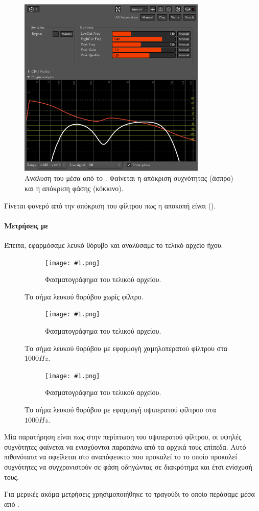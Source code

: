 \documentclass[12pt]{extarticle}
\newcommand{\filterspectrums}[2]
{
\begin{figure}
     \centering
     \begin{subfigure}[b]{\textwidth}
         \centering
         \texttt{[image: \#1.png]}
         \caption{Φασματογράφημα του τελικού αρχείου.}
     \end{subfigure}
     \hfill
     \hfill
        \caption{#2}
\end{figure}
}
\begin{document}
\begin{figure}[htpb]
    \centering
    \includegraphics[width=0.8\textwidth]{./assets/PluginAnalysisArdour.png}
    \caption{Ανάλυση του  μέσα από το . Φαίνεται η απόκριση συχνότητας (άσπρο) και η απόκριση φάσης (κόκκινο).}
    \label{fig:ardour_analysis}
\end{figure}

Γίνεται φανερό από την απόκριση του φίλτρου πως η αποκοπή 
είναι  (). 

\paragraph{Μετρήσεις με }
Έπειτα, εφαρμόσαμε λευκό θόρυβο και αναλύσαμε το τελικό αρχείο ήχου.

\filterspectrums{./assets/WhiteNoise}{Το σήμα λευκού θορύβου χωρίς φίλτρο.}
\filterspectrums{./assets/WhiteNoiseLP}{Το σήμα λευκού θορύβου με εφαρμογή χαμηλοπερατού φίλτρου στα $1000Hz$.}
\filterspectrums{./assets/WhiteNoiseHP}{Το σήμα λευκού θορύβου με εφαρμογή υψιπερατού φίλτρου στα $1000Hz$.}

Μία παρατήρηση είναι πως στην περίπτωση του υψιπερατού φίλτρου, οι υψηλές συχνότητες φαίνεται 
να ενισχύονται παραπάνω από τα αρχικά τους επίπεδα. Αυτό πιθανότατα να οφείλεται στο αναπόφευκτο 
που προκαλεί το  το οποίο προκαλεί συχνότητες να συγχρονιστούν σε φάση οδηγώντας σε διακρότημα
και έτσι ενίσχυσή τους.

\iffalse

Για μερικές ακόμα μετρήσεις χρησιμοποιήθηκε το τραγούδι  
το οποίο περάσαμε μέσα από . 
\end{document}
